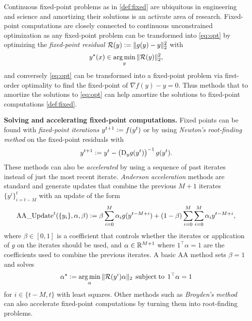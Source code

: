 \documentclass[twoside,11pt]{article}
\begin{document}
Continuous fixed-point problems as in \cref{def:fixed}
are ubiquitous in engineering and science and
amortizing their solutions is an activate area of research.
Fixed-point computations are closely connected to continuous
unconstrained optimization as any fixed-point problem can be
transformed into \cref{eq:opt} by optimizing the
\emph{fixed-point residual} ${\mathcal{R}}(y)\vcentcolon=\|g(y)-y\|_2^2$ with
\begin{equation}
  y^\star(x)\in\operatorname*{arg\,min}_y \|{\mathcal{R}}(y)\|_2^2,
  \label{eq:fixed-point-opt}
\end{equation}
and conversely \cref{eq:opt} can be transformed into
a fixed-point problem via first-order optimality
to find the fixed-point of
$\nabla f(y) - y = 0$.
Thus methods that to amortize the solutions to \cref{eq:opt}
can help amortize the solutions
to fixed-point computations \cref{def:fixed}.

\textbf{Solving and accelerating fixed-point computations.}
Fixed points can be found with \emph{fixed-point iterations}
$y^{t+1}\vcentcolon= f(y^t)$ or by using
\emph{Newton's root-finding method} on the
fixed-point residuals with
\begin{equation}
  y^{t+1}\vcentcolon= y^t - \left(\mathrm{D}_y g(y^t)\right)^{-1} g(y^t).
  \label{eq:newton}
\end{equation}
These methods can also be \emph{accelerated} by using
a sequence of past iterates instead of just the most
recent iterate.
\emph{Anderson acceleration} methods
\citep{anderson1965iterative,walker2011anderson,zhang2020globally}
are standard and generate updates that combine the
previous $M+1$ iterates $\{y^i\}_{i=t-M}^t$  with an update of the form
\begin{equation}
  \label{eq:aa-update}
  {\rm AA\_Update}^t(\{y_i\}, \alpha, \beta) \vcentcolon=
  \beta \sum_{i=0}^M \alpha_i g(y^{t-M+i}) +
  (1-\beta)\sum_{i=0}^M\sum_{i=0}^M \alpha_i y^{t-M+i},
\end{equation}
where $\beta\in[0,1]$ is a coefficient that controls
whether the iterates or application of $g$ on the iterates
should be used, and $\alpha\in\mathbb{R}^{M+1}$ where $1^\top\alpha=1$
are the coefficients used to combine the previous iterates.
A basic AA method sets $\beta=1$ and solves
\begin{equation}
  \label{eq:aa-alpha}
  \alpha^\star\vcentcolon= \operatorname*{arg\,min}_\alpha \|{\mathcal{R}}(y^i)\alpha\|_2\; \operatorname*{subject\;to}\; 1^\top \alpha = 1
\end{equation}
for $i\in\{t-M,t\}$ with least squares.
Other methods such as
\emph{Broyden's method} \citep{broyden1965class} can
also accelerate fixed-point computations by turning them
into root-finding problems.
\end{document}
